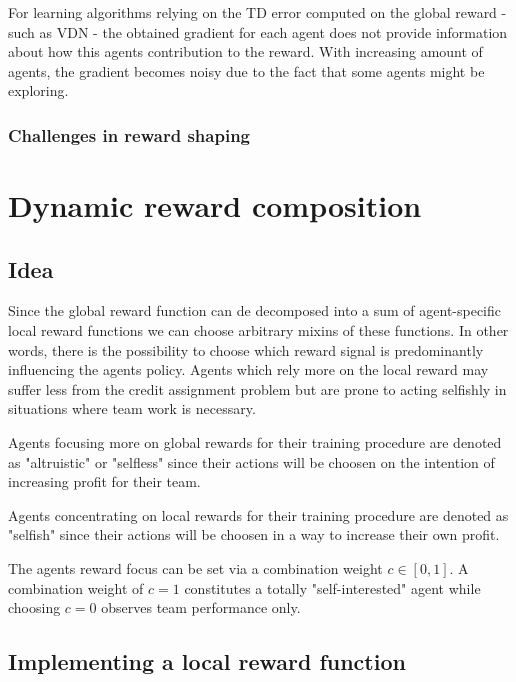 For learning algorithms relying on the TD error computed on the global reward - such as VDN - the obtained gradient for each agent does not provide information about how this agents contribution to the reward. With increasing amount of agents, the gradient becomes noisy due to the fact that some agents might be exploring.
\cite{foerster2018counterfactual}

\subsection{Challenges in reward shaping}

\chapter{Dynamic reward composition}
\section{Idea}

Since the global reward function can de decomposed into a sum of agent-specific local reward functions we can choose arbitrary mixins of these functions. In other words, there is the possibility to choose which reward signal is predominantly influencing the agents policy. Agents which rely more on the local reward may suffer less from the credit assignment problem but are prone to acting selfishly in situations where team work is necessary.

Agents focusing more on global rewards for their training procedure are denoted as "altruistic" or "selfless" since their actions will be choosen on the intention of increasing profit for their team.

Agents concentrating on local rewards for their training procedure are denoted as "selfish" since their actions will be choosen in a way to increase their own profit.

The agents reward focus can be set via a combination weight $c \in [0,1]$. A combination weight of $c=1$ constitutes a totally "self-interested" agent while choosing $c=0$ observes team performance only.
\section{Implementing a local reward function}

